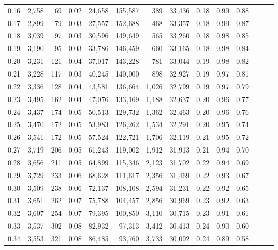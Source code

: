 \begin{tabular}{rrrrrrrrrrrrrr}
0.16 &  2,758 &   69 &  0.02 &   24,658 &  155,587 &     389 &  33,436 &  0.18 &  0.99 &      0.88 \\
0.17 &  2,899 &   79 &  0.03 &   27,557 &  152,688 &     468 &  33,357 &  0.18 &  0.99 &      0.87 \\
0.18 &  3,039 &   97 &  0.03 &   30,596 &  149,649 &     565 &  33,260 &  0.18 &  0.98 &      0.85 \\
0.19 &  3,190 &   95 &  0.03 &   33,786 &  146,459 &     660 &  33,165 &  0.18 &  0.98 &      0.84 \\
0.20 &  3,231 &  121 &  0.04 &   37,017 &  143,228 &     781 &  33,044 &  0.19 &  0.98 &      0.82 \\
0.21 &  3,228 &  117 &  0.03 &   40,245 &  140,000 &     898 &  32,927 &  0.19 &  0.97 &      0.81 \\
0.22 &  3,336 &  128 &  0.04 &   43,581 &  136,664 &   1,026 &  32,799 &  0.19 &  0.97 &      0.79 \\
0.23 &  3,495 &  162 &  0.04 &   47,076 &  133,169 &   1,188 &  32,637 &  0.20 &  0.96 &      0.77 \\
0.24 &  3,437 &  174 &  0.05 &   50,513 &  129,732 &   1,362 &  32,463 &  0.20 &  0.96 &      0.76 \\
0.25 &  3,470 &  172 &  0.05 &   53,983 &  126,262 &   1,534 &  32,291 &  0.20 &  0.95 &      0.74 \\
0.26 &  3,541 &  172 &  0.05 &   57,524 &  122,721 &   1,706 &  32,119 &  0.21 &  0.95 &      0.72 \\
0.27 &  3,719 &  206 &  0.05 &   61,243 &  119,002 &   1,912 &  31,913 &  0.21 &  0.94 &      0.70 \\
0.28 &  3,656 &  211 &  0.05 &   64,899 &  115,346 &   2,123 &  31,702 &  0.22 &  0.94 &      0.69 \\
0.29 &  3,729 &  233 &  0.06 &   68,628 &  111,617 &   2,356 &  31,469 &  0.22 &  0.93 &      0.67 \\
0.30 &  3,509 &  238 &  0.06 &   72,137 &  108,108 &   2,594 &  31,231 &  0.22 &  0.92 &      0.65 \\
0.31 &  3,651 &  262 &  0.07 &   75,788 &  104,457 &   2,856 &  30,969 &  0.23 &  0.92 &      0.63 \\
0.32 &  3,607 &  254 &  0.07 &   79,395 &  100,850 &   3,110 &  30,715 &  0.23 &  0.91 &      0.61 \\
0.33 &  3,537 &  302 &  0.08 &   82,932 &   97,313 &   3,412 &  30,413 &  0.24 &  0.90 &      0.60 \\
0.34 &  3,553 &  321 &  0.08 &   86,485 &   93,760 &   3,733 &  30,092 &  0.24 &  0.89 &      0.58 \\

\end{tabular}
